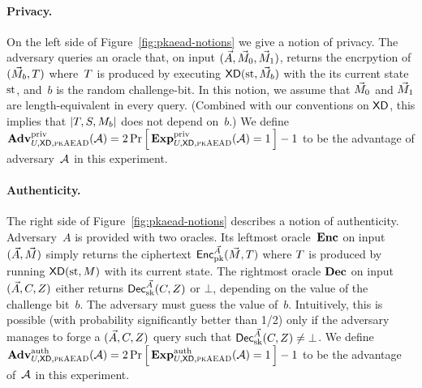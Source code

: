 \paragraph{Privacy. }
On the left side of Figure~\ref{fig:pkaead-notions} we give a notion of privacy.  The adversary queries an oracle that, on input $(\vec{A},\vec{M}_0,\vec{M}_1)$, returns the encrpytion of $(\vec{M}_b,T)$ where~$T$ is produced by executing $\mathsf{XD}(\mathrm{st},\vec{M}_b)$ with the its current state~$\mathrm{st}$, and~$b$ is the random challenge-bit.  In this notion, we assume that $\vec{M}_0$ and $\vec{M}_1$ are length-equivalent in every query. (Combined with our conventions on $\mathsf{XD}$, this implies that $|T,S,M_b|$ does not depend on~$b$.) 
  We define $\mathbf{Adv}^{\mathrm{priv}}_{U,\mathsf{XD},\textsc{pkAEAD}}{({\cal A})}=2\,{\Pr\left[\,{\mathbf{Exp}^{\mathrm{priv}}_{U,\mathsf{XD},\textsc{pkAEAD}}{({\cal A})}=1}\,\right]}-1$ to be the advantage of adversary~${\cal A}$ in this experiment.  

\paragraph{Authenticity. } 
The right side of Figure~\ref{fig:pkaead-notions} describes a notion of authenticity.  Adversary~$A$ is provided with two oracles.  Its leftmost oracle~$\textbf{Enc}$ on input $(\vec{A},\vec{M})$ simply returns the ciphertext ${\mathsf{Enc}}_{\mathrm{pk}}^{\vec{A}}(\vec{M},T)$ where $T$ is produced by running $\mathsf{XD}(\mathrm{st},M)$ with its current state.  The rightmost oracle $\textbf{Dec}$ on input $(\vec{A},C,Z)$ either returns ${\mathsf{Dec}}_{\mathrm{sk}}^{\vec{A}}(C,Z)$ or $\bot$, depending on the value of the challenge bit~$b$.  The adversary must guess the value of~$b$.  Intuitively, this is possible (with probability significantly better than 1/2) only if the adversary manages to forge a $(\vec{A},C,Z)$ query such that ${\mathsf{Dec}}_{\mathrm{sk}}^{\vec{A}}(C,Z) \neq \bot$.   We define $\mathbf{Adv}^{\mathrm{auth}}_{U,\mathsf{XD},\textsc{pkAEAD}}{({\cal A})}=2\,{\Pr\left[\,{\mathbf{Exp}^{\mathrm{auth}}_{U,\mathsf{XD},\textsc{pkAEAD}}{({\cal A})}=1}\,\right]}-1$ to be the advantage of~${\cal A}$ in this experiment. 


